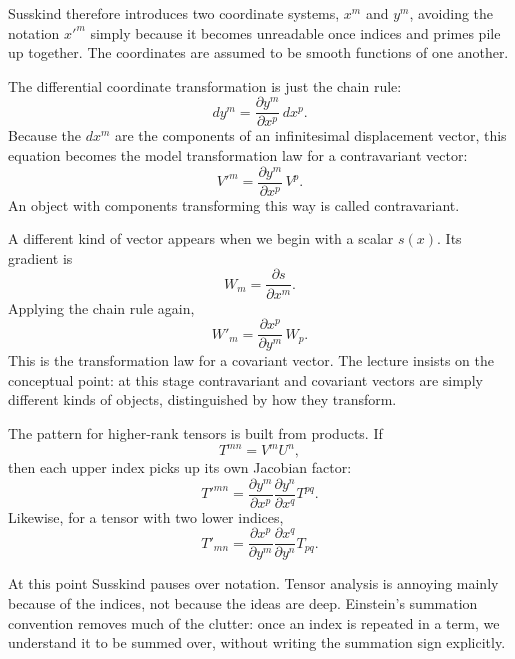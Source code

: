 Susskind therefore introduces two coordinate systems, \(x^m\) and \(y^m\), avoiding the notation \(x'^m\) simply because it becomes unreadable once indices and primes pile up together.  The coordinates are assumed to be smooth functions of one another.

The differential coordinate transformation is just the chain rule:
\begin{equation}
dy^m = \frac{\partial y^m}{\partial x^p}\,dx^p.
\end{equation}
Because the \(dx^m\) are the components of an infinitesimal displacement vector, this equation becomes the model transformation law for a contravariant vector:
\begin{equation}
V'^m = \frac{\partial y^m}{\partial x^p}\,V^p.
\end{equation}
An object with components transforming this way is called contravariant.

A different kind of vector appears when we begin with a scalar \(s(x)\).  Its gradient is
\begin{equation}
W_m = \frac{\partial s}{\partial x^m}.
\end{equation}
Applying the chain rule again,
\begin{equation}
W'_m = \frac{\partial x^p}{\partial y^m}\,W_p.
\end{equation}
This is the transformation law for a covariant vector.  The lecture insists on the conceptual point: at this stage contravariant and covariant vectors are simply different kinds of objects, distinguished by how they transform.

The pattern for higher-rank tensors is built from products.  If
\begin{equation}
T^{mn}=V^mU^n,
\end{equation}
then each upper index picks up its own Jacobian factor:
\begin{equation}
T'^{mn} = \frac{\partial y^m}{\partial x^p}\frac{\partial y^n}{\partial x^q}T^{pq}.
\end{equation}
Likewise, for a tensor with two lower indices,
\begin{equation}
T'_{mn} = \frac{\partial x^p}{\partial y^m}\frac{\partial x^q}{\partial y^n}T_{pq}.
\end{equation}

At this point Susskind pauses over notation.  Tensor analysis is annoying mainly because of the indices, not because the ideas are deep.  Einstein's summation convention removes much of the clutter: once an index is repeated in a term, we understand it to be summed over, without writing the summation sign explicitly.

